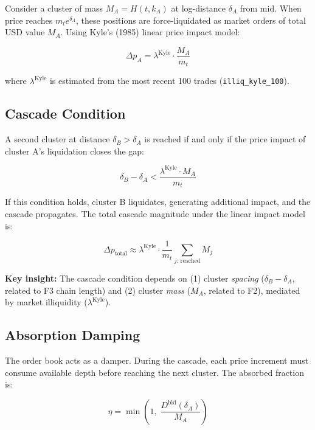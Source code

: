 \documentclass[11pt,a4paper]{article}
\begin{document}
Consider a cluster of mass $M_A = H(t, k_A)$ at log-distance $\delta_A$ from mid. When price reaches $m_t e^{\delta_A}$, these positions are force-liquidated as market orders of total USD value $M_A$. Using Kyle's (1985) linear price impact model:

\begin{equation}
\Delta p_A = \lambda^{\text{Kyle}} \cdot \frac{M_A}{m_t}
\end{equation}

where $\lambda^{\text{Kyle}}$ is estimated from the most recent 100 trades (\texttt{illiq\_kyle\_100}).

\subsection{Cascade Condition}

A second cluster at distance $\delta_B > \delta_A$ is reached if and only if the price impact of cluster A's liquidation closes the gap:

\begin{equation}
\boxed{\delta_B - \delta_A < \frac{\lambda^{\text{Kyle}} \cdot M_A}{m_t}}
\end{equation}

If this condition holds, cluster B liquidates, generating additional impact, and the cascade propagates. The total cascade magnitude under the linear impact model is:

\begin{equation}
\Delta p_{\text{total}} \approx \lambda^{\text{Kyle}} \cdot \frac{1}{m_t} \sum_{j:\, \text{reached}} M_j
\end{equation}

\textbf{Key insight:} The cascade condition depends on (1) cluster \textit{spacing} ($\delta_B - \delta_A$, related to F3 chain length) and (2) cluster \textit{mass} ($M_A$, related to F2), mediated by market illiquidity ($\lambda^{\text{Kyle}}$).

\subsection{Absorption Damping}

The order book acts as a damper. During the cascade, each price increment must consume available depth before reaching the next cluster. The absorbed fraction is:

\begin{equation}
\eta = \min\!\left(1,\; \frac{D^{\text{bid}}(\delta_A)}{M_A}\right)
\end{equation}
\end{document}
